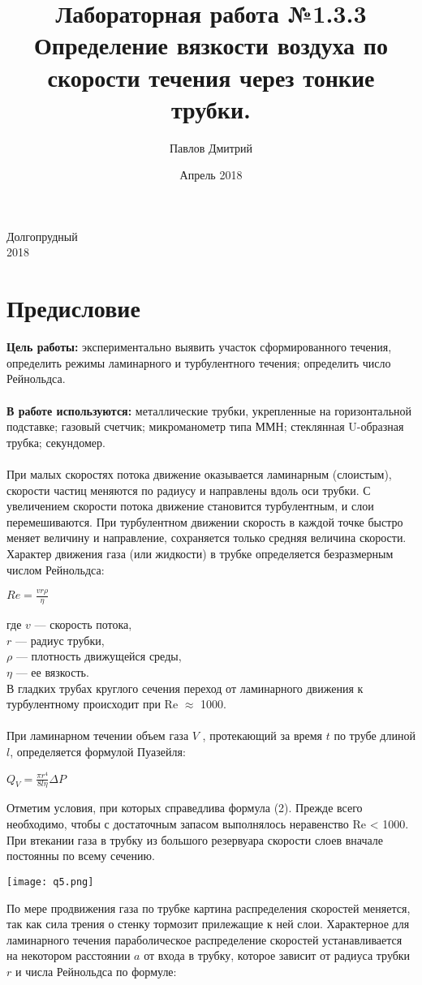 \documentclass{article}
\title{Лабораторная работа №1.3.3 \\ Определение вязкости воздуха по скорости течения через тонкие трубки.}
\author{Павлов Дмитрий}
\date{Апрель 2018}
\begin{document}
\maketitle
\begin{center}
Долгопрудный \\2018
\end{center}
\newpage

\newpage
\section{Предисловие}
\textbf{Цель работы:} экспериментально выявить участок сформированного течения, определить режимы ламинарного и турбулентного течения; определить число Рейнольдса.\\
\\
\textbf{В работе используются:} металлические трубки, укрепленные на горизонтальной подставке; газовый счетчик; микроманометр типа ММН; стеклянная U-образная трубка; секундомер.\\
\\
При малых скоростях потока движение оказывается ламинарным (слоистым), скорости частиц меняются по радиусу и направлены вдоль оси трубки. С увеличением скорости потока движение становится турбулентным, и слои перемешиваются. При турбулентном движении скорость в каждой точке быстро меняет величину и направление, сохраняется только средняя величина скорости.\\
Характер движения газа (или жидкости) в трубке определяется безразмерным числом Рейнольдса:
\begin{center}
    $Re = \frac{vr\rho}{\eta}$
\end{center}  
где $v$ — скорость потока,\\
$r$ — радиус трубки,\\
$\rho$ — плотность движущейся среды, \\
$\eta$ — ее вязкость.\\
В гладких трубах круглого сечения переход от ламинарного движения к турбулентному происходит при Re $\approx$ 1000.\\
\\
При ламинарном течении объем газа $V$ , протекающий за время $t$ по трубе длиной $l$, определяется формулой Пуазейля:
\begin{center} \large{
    $Q_V = \frac{\pi r^4}{8l \eta}\Delta P$}
\end{center} 
Отметим условия, при которых справедлива формула (2). Прежде всего необходимо, чтобы с достаточным запасом выполнялось неравенство Re < 1000. При втекании газа в трубку из большого резервуара скорости слоев вначале постоянны по всему сечению.\begin{center} \texttt{[image: q5.png]} \end{center}  По мере продвижения газа по трубке картина распределения скоростей меняется, так как сила трения о стенку тормозит прилежащие к ней слои. Характерное для ламинарного течения параболическое распределение скоростей устанавливается на некотором расстоянии $a$ от входа в трубку, которое зависит от радиуса трубки $r$ и числа Рейнольдса по формуле:
\end{document}
